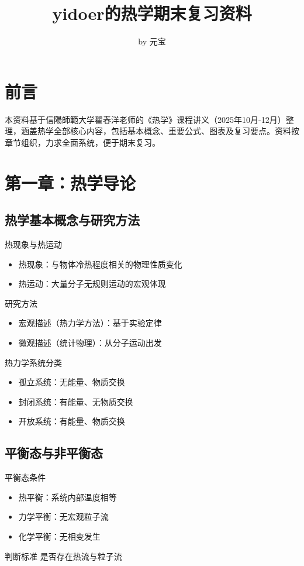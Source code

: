 \documentclass[12pt]{article}
\title{yidoer的热学期末复习资料}
\author{by 元宝}
\date{ }
\begin{document}
\maketitle


\section*{前言}
本资料基于信陽師範大学翟春洋老师的《热学》课程讲义（2025年10月-12月）整理，涵盖热学全部核心内容，包括基本概念、重要公式、图表及复习要点。资料按章节组织，力求全面系统，便于期末复习。

\section{第一章：热学导论}
\subsection{热学基本概念与研究方法}

热现象与热运动
\begin{itemize}
    \item 热现象：与物体冷热程度相关的物理性质变化
    \item 热运动：大量分子无规则运动的宏观体现
\end{itemize}

研究方法
\begin{itemize}
    \item 宏观描述（热力学方法）：基于实验定律
    \item 微观描述（统计物理）：从分子运动出发
\end{itemize}

热力学系统分类
\begin{itemize}
    \item 孤立系统：无能量、物质交换
    \item 封闭系统：有能量、无物质交换  
    \item 开放系统：有能量、物质交换
\end{itemize}

\subsection{平衡态与非平衡态}
平衡态条件
\begin{itemize}
    \item 热平衡：系统内部温度相等
    \item 力学平衡：无宏观粒子流
    \item 化学平衡：无相变发生
\end{itemize}
判断标准
是否存在热流与粒子流
\end{document}
